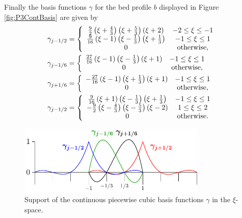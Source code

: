 Finally the basis functions $\gamma$ for the bed profile $b$ displayed in Figure \ref{fig:P3ContBasis} are given by
\begin{subequations}
	\label{eqn:App1:GamDef}
\begin{align}
\gamma_{j-1/2} &= \left\lbrace \begin{array}{c c}
\frac{9}{2}\left(\xi + \frac{4}{3}\right)\left(\xi + \frac{5}{3}\right)\left(\xi + 2\right) & -2 \le \xi \le -1\\
\frac{9}{16}\left(\xi - 1\right)\left(\xi - \frac{1}{3}\right)\left(\xi  + \frac{1}{3}\right) & -1 \le \xi \le 1\\
0 & \text{otherwise}, 
\end{array} \right. \\
\gamma_{j-1/6} &= \left\lbrace \begin{array}{c c}
\frac{27}{16}\left(\xi - 1\right)\left(\xi - \frac{1}{3}\right)\left(\xi + 1\right) & -1 \le \xi \le 1\\
0 & \text{otherwise}, 
\end{array} \right. \\
\gamma_{j+1/6} &= \left\lbrace \begin{array}{c c}
-\frac{27}{16}\left(\xi - 1\right)\left(\xi + \frac{1}{3}\right)\left(\xi + 1\right) & -1 \le \xi \le 1\\
0 & \text{otherwise} ,
\end{array} \right. \\
\gamma_{j-1/2} &= \left\lbrace \begin{array}{c c}
\frac{9}{16}\left(\xi + 1\right)\left(\xi - \frac{1}{3}\right)\left(\xi  + \frac{1}{3}\right) & -1 \le \xi \le 1\\
-\frac{9}{2}\left(\xi - \frac{4}{3}\right)\left(\xi - \frac{5}{3}\right)\left(\xi - 2\right) & 1 \le \xi \le 2\\
0 & \text{otherwise} .
\end{array} \right. 
\end{align}
\end{subequations}

\begin{figure}
	\centering
	\includegraphics[width=0.8\textwidth]{./app1/Figures/P3.pdf}
	\caption{Support of the continuous piecewise cubic basis functions $\gamma$ in the $\xi$-space.}
	\label{fig:P3ContBasisAPP}
\end{figure}

